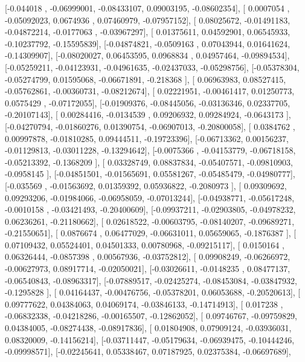 \documentclass{article}
\begin{document}
       [-0.044018  , -0.06999001, -0.08433107,  0.09003195, -0.08602354],
       [ 0.0007054 , -0.05092023,  0.0674936 ,  0.07460979, -0.07957152],
       [ 0.08025672, -0.01491183, -0.04872214, -0.0177063 , -0.03967297],
       [ 0.01375611,  0.04592901,  0.06545933, -0.10237792, -0.15595839],
       [-0.04874821, -0.0509163 ,  0.07043944,  0.01641624, -0.14309907],
       [-0.08020027,  0.06453595,  0.0968834 ,  0.04957464, -0.09894534],
       [-0.05259211, -0.04123931, -0.04961635, -0.02437033, -0.05298756],
       [-0.05378304, -0.05274799,  0.01595068, -0.06671891, -0.218368  ],
       [ 0.06963983,  0.08527415, -0.05762861, -0.00360731, -0.08212674],
       [ 0.02221951, -0.00461417,  0.01250773,  0.0575429 , -0.07172055],
       [-0.01909376, -0.08445056, -0.03136346,  0.02337705, -0.20107143],
       [ 0.00284416, -0.0134539 ,  0.09206932,  0.09284924, -0.0643173 ],
       [-0.04270794, -0.01860276,  0.01390754, -0.06907013, -0.20800058],
       [ 0.0384762 ,  0.00997878, -0.01810285,  0.09444511, -0.19723396],
       [-0.06713362,  0.00156237, -0.01129813, -0.03011228, -0.13294642],
       [-0.0075366 , -0.04153779, -0.06718158, -0.05213392, -0.1368209 ],
       [ 0.03328749,  0.08837834, -0.05407571, -0.09810903, -0.0958145 ],
       [-0.04851501, -0.01565691,  0.05581267, -0.05485479, -0.04980777],
       [-0.035569  , -0.01563692,  0.01359392,  0.05936822, -0.2080973 ],
       [ 0.09309692,  0.09293206, -0.01984066, -0.06958059, -0.07013244],
       [-0.04938771, -0.05617248, -0.0010158 , -0.03421493, -0.20400609],
       [-0.09937211, -0.02903805, -0.04978232,  0.06236261, -0.21180662],
       [ 0.02618522, -0.00603795, -0.08140207, -0.09689271, -0.21550651],
       [ 0.0876674 ,  0.06477029, -0.06631011,  0.05659065, -0.1876387 ],
       [ 0.07109432,  0.05524401,  0.04501333,  0.00780968, -0.09215117],
       [ 0.0150164 ,  0.06326444, -0.0857398 ,  0.00567936, -0.03752812],
       [ 0.09908249, -0.06266972, -0.00627973,  0.08917714, -0.02050021],
       [-0.03026611, -0.0148235 ,  0.08477137, -0.06540843, -0.08963317],
       [-0.07889517, -0.02425274, -0.08453084, -0.03847932, -0.1295828 ],
       [ 0.04164437, -0.00476756, -0.05378201,  0.06053688, -0.20520613],
       [ 0.09777622,  0.04384063,  0.04069174, -0.03846133, -0.14714913],
       [ 0.017238  , -0.06832338, -0.04218286, -0.00165507, -0.12862052],
       [ 0.09746767, -0.09759829,  0.04384005, -0.08274438, -0.08917836],
       [ 0.01804908,  0.07909124, -0.03936031,  0.08320009, -0.14156214],
       [-0.03711447, -0.05179634, -0.06939475, -0.10444246, -0.09998571],
       [-0.02245641,  0.05338467,  0.07187925,  0.02375384, -0.06697689],
\end{document}
